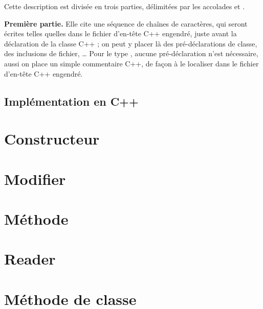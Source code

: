 Cette description est divisée en trois parties, délimitées par les accolades \galgas{\{} et \galgas{\}}.

\textbf{Première partie.} Elle cite une séquence de chaînes de caractères, qui seront écrites telles quelles dans le fichier d'en-tête C++ engendré, juste avant la déclaration de la classe C++ ; on peut y placer là des pré-déclarations de classe, des inclusions de fichier, … Pour le type , aucune pré-déclaration n'est nécessaire, aussi on place un simple commentaire C++, de façon à le localiser dans le fichier d'en-tête C++ engendré.

\subsection{Implémentation en C++}






\section{Constructeur}


\section{Modifier}


\section{Méthode}


\section{Reader}


\section{Méthode de classe}

